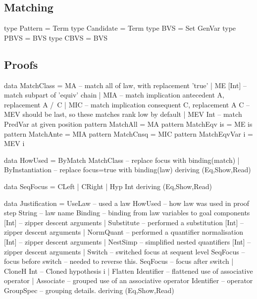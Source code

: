\subsection{Matching}

\begin{code}
type Pattern = Term
type Candidate = Term
type BVS = Set GenVar
type PBVS = BVS
type CBVS = BVS
\end{code}

\newpage
\subsection{Proofs}

\begin{code}
data MatchClass
  = MA       -- match all of law, with replacement 'true'
  | ME [Int] -- match subpart of 'equiv' chain
  | MIA      -- match implication antecedent A, replacement A /\ C
  | MIC      -- match implication consequent C, replacement A \/ C
  -- MEV should be last, so these matches rank low by default
  | MEV Int  -- match PredVar at given position
pattern MatchAll       = MA
pattern MatchEqv is    = ME is
pattern MatchAnte      = MIA
pattern MatchCnsq      = MIC
pattern MatchEqvVar i  = MEV i
\end{code}

\begin{code}
data HowUsed
  = ByMatch MatchClass  -- replace focus with binding(match)
  | ByInstantiation     -- replace focus=true with binding(law)
  deriving (Eq,Show,Read)
\end{code}

\begin{code}
data SeqFocus = CLeft | CRight | Hyp Int deriving (Eq,Show,Read)
\end{code}

\begin{code}
data Justification
  = UseLaw             -- used a law
      HowUsed              -- how law was used in proof step
      String               -- law name
      Binding              -- binding from law variables to goal components
      [Int]                -- zipper descent arguments
  | Substitute         -- performed a substitution
      [Int]                -- zipper descent arguments
  | NormQuant          -- performed a quantifier normalisation
      [Int]                -- zipper descent arguments
  | NestSimp           -- simplified nested quantifiers
      [Int]                -- zipper descent arguments
  | Switch             -- switched focus at sequent level
      SeqFocus             -- focus before switch -- needed to reverse this.
      SeqFocus             -- focus after switch
  | CloneH Int         --  Cloned hypothesis i
  | Flatten Identifier -- flattened use of associative operator
  | Associate          -- grouped use of an associative operator
      Identifier           -- operator
      GroupSpec            -- grouping details.
  deriving (Eq,Show,Read)
\end{code}


